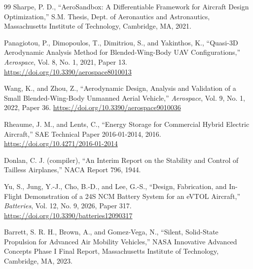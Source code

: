 \documentclass[journal]{new-aiaa}
\begin{document}
\begin{thebibliography}{99}
 Sharpe, P. D., ``AeroSandbox: A Differentiable Framework for Aircraft Design Optimization,'' S.M. Thesis, Dept. of Aeronautics and Astronautics, Massachusetts Institute of Technology, Cambridge, MA, 2021.

 Panagiotou, P., Dimopoulos, T., Dimitriou, S., and Yakinthos, K., ``Quasi-3D Aerodynamic Analysis Method for Blended-Wing-Body UAV Configurations,'' \textit{Aerospace}, Vol. 8, No. 1, 2021, Paper 13. \url{https://doi.org/10.3390/aerospace8010013}

 Wang, K., and Zhou, Z., ``Aerodynamic Design, Analysis and Validation of a Small Blended-Wing-Body Unmanned Aerial Vehicle,'' \textit{Aerospace}, Vol. 9, No. 1, 2022, Paper 36. \url{https://doi.org/10.3390/aerospace9010036}

 Rheaume, J. M., and Lents, C., ``Energy Storage for Commercial Hybrid Electric Aircraft,'' SAE Technical Paper 2016-01-2014, 2016. \url{https://doi.org/10.4271/2016-01-2014}

 Donlan, C. J. (compiler), ``An Interim Report on the Stability and Control of Tailless Airplanes,'' NACA Report 796, 1944.

 Yu, S., Jung, Y.-J., Cho, B.-D., and Lee, G.-S., ``Design, Fabrication, and In-Flight Demonstration of a 24S NCM Battery System for an eVTOL Aircraft,'' \textit{Batteries}, Vol. 12, No. 9, 2026, Paper 317. \url{https://doi.org/10.3390/batteries12090317}

 Barrett, S. R. H., Brown, A., and Gomez-Vega, N., ``Silent, Solid-State Propulsion for Advanced Air Mobility Vehicles,'' NASA Innovative Advanced Concepts Phase I Final Report, Massachusetts Institute of Technology, Cambridge, MA, 2023.

\end{thebibliography}
\end{document}
